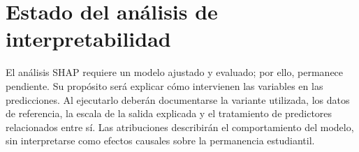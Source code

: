 \label{editorial:shapestado}
\section{Estado del análisis de interpretabilidad}
El análisis SHAP requiere un modelo ajustado y evaluado; por ello, permanece pendiente. Su propósito será explicar cómo intervienen las variables en las predicciones. Al ejecutarlo deberán documentarse la variante utilizada, los datos de referencia, la escala de la salida explicada y el tratamiento de predictores relacionados entre sí. Las atribuciones describirán el comportamiento del modelo, sin interpretarse como efectos causales sobre la permanencia estudiantil.
